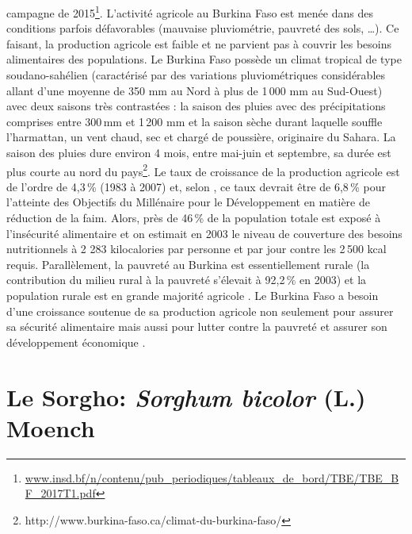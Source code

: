 \documentclass[a4paper,11pt]{article}
\begin{document}
campagne de
2015\footnote{\url{www.insd.bf/n/contenu/pub_periodiques/tableaux_de_bord/TBE/TBE_BF_2017T1.pdf}}. L'activité
agricole au Burkina Faso est menée dans des conditions parfois
défavorables (mauvaise pluviométrie, pauvreté des sols, \ldots{}). Ce
faisant, la production agricole est faible et ne parvient pas à
couvrir les besoins alimentaires des populations. Le Burkina Faso
possède un climat tropical de type soudano-sahélien (caractérisé par
des variations pluviométriques considérables allant d'une moyenne de
350 mm au Nord à plus de 1\,000 mm au Sud-Ouest) avec deux saisons
très contrastées : la saison des pluies avec des précipitations
comprises entre 300\,mm et 1\,200 mm et la saison sèche durant
laquelle souffle l'harmattan, un vent chaud, sec et chargé de
poussière, originaire du Sahara. La saison des pluies dure environ 4
mois, entre mai-juin et septembre, sa durée est plus courte au nord du
pays\footnote{http://www.burkina-faso.ca/climat-du-burkina-faso/}. Le
taux de croissance de la production agricole est de l'ordre de 4,3\,\%
(1983 à 2007) et, selon \citeauthor{Ngaido_2006},
\citeyear{Ngaido_2006} ce taux devrait être de 6,8\,\% pour l'atteinte
des Objectifs du Millénaire pour le Développement en matière de
réduction de la faim. Alors, près de 46\,\% de la population totale
est exposé à l'insécurité alimentaire et on estimait en 2003 le niveau
de couverture des besoins nutritionnels à 2 283 kilocalories par
personne et par jour contre les 2\,500 kcal requis. Parallèlement, la
pauvreté au Burkina est essentiellement rurale (la contribution du
milieu rural à la pauvreté s'élevait à 92,2\,\% en 2003) et la
population rurale est en grande majorité agricole
\cite{DPSAA_2011}. Le Burkina Faso a besoin d'une croissance soutenue
de sa production agricole non seulement pour assurer sa sécurité
alimentaire mais aussi pour lutter contre la pauvreté et assurer son
développement économique \cite{Koulibi_FideleZONGO}.

\section{Le Sorgho: \emph{Sorghum bicolor} (L.) Moench}



\end{document}
